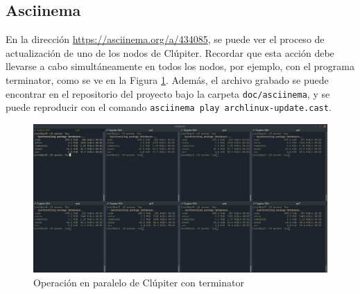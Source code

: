 \subsection{Asciinema}
En la dirección \url{https://asciinema.org/a/434085}, se puede ver el proceso de actualización de uno de los nodos de Clúpiter. Recordar que esta acción debe llevarse a cabo simultáneamente en todos los nodos, por ejemplo, con el programa terminator, como se ve en la Figura \ref{fig:terminator_update}. Además, el archivo grabado se puede encontrar en el repositorio del proyecto bajo la carpeta \texttt{doc/asciinema}, y se puede reproducir con el comando \texttt{asciinema play archlinux-update.cast}.

\begin{figure}[h!]
  \centering
  \includegraphics[width=\textwidth]{img/terminator_update.png}
  \caption{Operación en paralelo de Clúpiter con terminator}
  \label{fig:terminator_update}
\end{figure}
